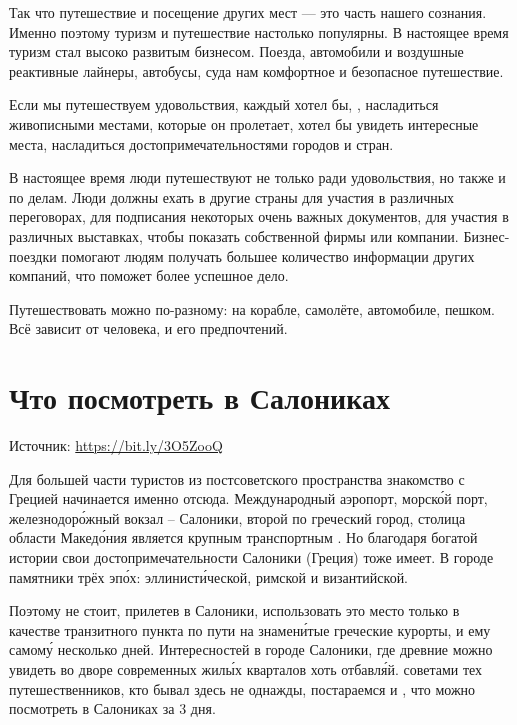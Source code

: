 Так что путешествие и посещение других мест --- это часть нашего сознания. Именно поэтому туризм и путешествие настолько популярны. В настоящее время туризм стал высоко развитым бизнесом. Поезда, автомобили и воздушные реактивные лайнеры, автобусы, суда  нам комфортное и безопасное путешествие.

Если мы путешествуем  удовольствия, каждый хотел бы, , насладиться живописными местами, которые он пролетает, хотел бы увидеть интересные места, насладиться достопримечательностями городов и стран.

В настоящее время люди путешествуют не только ради удовольствия, но также и по делам. Люди должны ехать в другие страны для участия в различных переговорах, для подписания некоторых очень важных документов, для участия в различных выставках, чтобы показать  собственной фирмы или компании. Бизнес-поездки помогают людям получать большее количество информации   других компаний, что поможет  более успешное дело.

Путешествовать можно по-разному: на корабле, самолёте, автомобиле, пешком. Всё зависит от человека, и его предпочтений.


\section{Что посмотреть в Салониках}
Источник: \url{https://bit.ly/3O5ZooQ}

Для большей части туристов из постсоветского пространства знакомство с Грецией начинается именно отсюда. Международный аэропорт, морск\'{о}й порт, железнодор\'{о}жный вокзал -- Салоники, второй по  греческий город, столица области Макед\'{о}ния является крупным транспортным . Но благодаря богатой истории свои достопримечательности Салоники (Греция) тоже имеет. В городе  памятники трёх эп\'{о}х: эллинист\'{и}ческой, римской и византийской.

Поэтому не стоит, прилетев в Салоники, использовать это место только в качестве транзитного пункта по пути на знамен\'{и}тые греческие курорты,  и ему самом\'{у} несколько дней. Интересностей в городе Салоники, где древние  можно увидеть во дворе современных жил\'{ы}х кварталов хоть отбавл\'{я}й.  советами тех путешественников, кто бывал здесь не однажды, постараемся  и , что можно посмотреть в Салониках за 3 дня.

